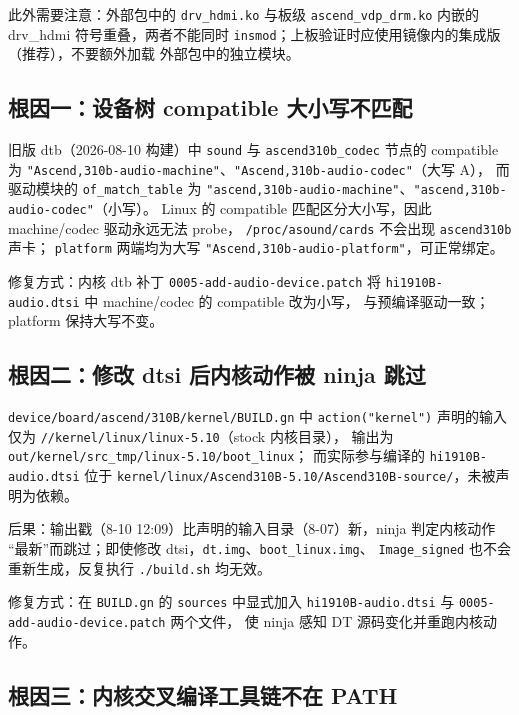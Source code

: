 此外需要注意：外部包中的 \texttt{drv\_hdmi.ko} 与板级
\texttt{ascend\_vdp\_drm.ko} 内嵌的 drv\_hdmi 符号重叠，两者不能同时
\texttt{insmod}；上板验证时应使用镜像内的集成版（推荐），不要额外加载
外部包中的独立模块。

\subsection{根因一：设备树 compatible 大小写不匹配}

旧版 dtb（2026-08-10 构建）中 \texttt{sound} 与 \texttt{ascend310b\_codec}
节点的 compatible 为
\texttt{"Ascend,310b-audio-machine"}、\texttt{"Ascend,310b-audio-codec"}（大写 A），
而驱动模块的 \texttt{of\_match\_table} 为
\texttt{"ascend,310b-audio-machine"}、\texttt{"ascend,310b-audio-codec"}（小写）。
Linux 的 compatible 匹配区分大小写，因此 machine/codec 驱动永远无法 probe，
\texttt{/proc/asound/cards} 不会出现 \texttt{ascend310b} 声卡；
\texttt{platform} 两端均为大写 \texttt{"Ascend,310b-audio-platform"}，可正常绑定。

修复方式：内核 dtb 补丁 \texttt{0005-add-audio-device.patch} 将
\texttt{hi1910B-audio.dtsi} 中 machine/codec 的 compatible 改为小写，
与预编译驱动一致；platform 保持大写不变。

\subsection{根因二：修改 dtsi 后内核动作被 ninja 跳过}

\texttt{device/board/ascend/310B/kernel/BUILD.gn} 中 \texttt{action("kernel")}
声明的输入仅为 \texttt{//kernel/linux/linux-5.10}（stock 内核目录），
输出为 \texttt{out/kernel/src\_tmp/linux-5.10/boot\_linux}；
而实际参与编译的 \texttt{hi1910B-audio.dtsi} 位于
\texttt{kernel/linux/Ascend310B-5.10/Ascend310B-source/}，未被声明为依赖。

后果：输出戳（8-10 12:09）比声明的输入目录（8-07）新，ninja 判定内核动作
``最新''而跳过；即使修改 dtsi，\texttt{dt.img}、\texttt{boot\_linux.img}、
\texttt{Image\_signed} 也不会重新生成，反复执行 \texttt{./build.sh} 均无效。

修复方式：在 \texttt{BUILD.gn} 的 \texttt{sources} 中显式加入
\texttt{hi1910B-audio.dtsi} 与 \texttt{0005-add-audio-device.patch} 两个文件，
使 ninja 感知 DT 源码变化并重跑内核动作。

\subsection{根因三：内核交叉编译工具链不在 PATH}

